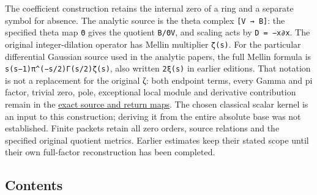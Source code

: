 \documentclass[
]{article}
\begin{document}
The coefficient construction retains the internal zero of a ring and a
separate symbol for absence. The analytic source is the theta complex
\texttt{{[}V\ →\ B{]}}: the specified theta map \texttt{Θ} gives the
quotient \texttt{B/ΘV}, and scaling acts by \texttt{D\ =\ −x∂x}. The
original integer-dilation operator has Mellin multiplier \texttt{ζ(s)}.
For the particular differential Gaussian source used in the analytic
papers, the full Mellin formula is \texttt{s(s−1)π\^{}(−s/2)Γ(s/2)ζ(s)},
also written \texttt{2ξ(s)} in earlier editions. That notation is not a
replacement for the original ζ: both endpoint terms, every Gamma and pi
factor, trivial zero, pole, exceptional local module and derivative
contribution remain in the
\href{https://github.com/KokunoYumeto/zeta-function-research-reader/blob/acd7016b8232a56f31ae3e69fb800571e8789080/workbenches/splitzero-tandem/continuations/20260923-retained-source-readers/original-zeta-full-boundary/independent/ORIGINAL_ZETA_THETA_CORRECTION.tex}{exact
source and return maps}. The chosen classical scalar kernel is an input
to this construction; deriving it from the entire absolute base was not
established. Finite packets retain all zero orders, source relations and
the specified original quotient metrics. Earlier estimates keep their
stated scope until their own full-factor reconstruction has been
completed.

\subsection{Contents}\label{contents}
\end{document}
